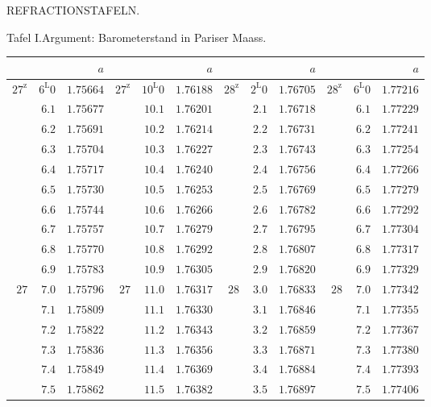 \begin{center}
{\small REFRACTIONSTAFELN.\par}
\medskip
Tafel I.\quad Argument: Barometerstand in Pariser Maass.
\medskip
{\fontsize{9}{10.2}\selectfont\setlength{\tabcolsep}{3pt}
\begin{tabular}{rr|r||rr|r||rr|r||rr|r}
&&$a$&&&$a$&&&$a$&&&$a$\\\hline
$27^{\mathrm{z}}$ & $6^{\mathrm{L}}0$ & $1.75664$ & $27^{\mathrm{z}}$ & $10^{\mathrm{L}}0$ & $1.76188$ & $28^{\mathrm{z}}$ & $2^{\mathrm{L}}0$ & $1.76705$ & $28^{\mathrm{z}}$ & $6^{\mathrm{L}}0$ & $1.77216$\\
 & $6.1$ & $1.75677$ &  & $10.1$ & $1.76201$ &  & $2.1$ & $1.76718$ &  & $6.1$ & $1.77229$\\
 & $6.2$ & $1.75691$ &  & $10.2$ & $1.76214$ &  & $2.2$ & $1.76731$ &  & $6.2$ & $1.77241$\\
 & $6.3$ & $1.75704$ &  & $10.3$ & $1.76227$ &  & $2.3$ & $1.76743$ &  & $6.3$ & $1.77254$\\
 & $6.4$ & $1.75717$ &  & $10.4$ & $1.76240$ &  & $2.4$ & $1.76756$ &  & $6.4$ & $1.77266$\\
 & $6.5$ & $1.75730$ &  & $10.5$ & $1.76253$ &  & $2.5$ & $1.76769$ &  & $6.5$ & $1.77279$\\
 & $6.6$ & $1.75744$ &  & $10.6$ & $1.76266$ &  & $2.6$ & $1.76782$ &  & $6.6$ & $1.77292$\\
 & $6.7$ & $1.75757$ &  & $10.7$ & $1.76279$ &  & $2.7$ & $1.76795$ &  & $6.7$ & $1.77304$\\
 & $6.8$ & $1.75770$ &  & $10.8$ & $1.76292$ &  & $2.8$ & $1.76807$ &  & $6.8$ & $1.77317$\\
 & $6.9$ & $1.75783$ &  & $10.9$ & $1.76305$ &  & $2.9$ & $1.76820$ &  & $6.9$ & $1.77329$\\[4pt]
$27$ & $7.0$ & $1.75796$ & $27$ & $11.0$ & $1.76317$ & $28$ & $3.0$ & $1.76833$ & $28$ & $7.0$ & $1.77342$\\
 & $7.1$ & $1.75809$ &  & $11.1$ & $1.76330$ &  & $3.1$ & $1.76846$ &  & $7.1$ & $1.77355$\\
 & $7.2$ & $1.75822$ &  & $11.2$ & $1.76343$ &  & $3.2$ & $1.76859$ &  & $7.2$ & $1.77367$\\
 & $7.3$ & $1.75836$ &  & $11.3$ & $1.76356$ &  & $3.3$ & $1.76871$ &  & $7.3$ & $1.77380$\\
 & $7.4$ & $1.75849$ &  & $11.4$ & $1.76369$ &  & $3.4$ & $1.76884$ &  & $7.4$ & $1.77393$\\
 & $7.5$ & $1.75862$ &  & $11.5$ & $1.76382$ &  & $3.5$ & $1.76897$ &  & $7.5$ & $1.77406$\\

\end{tabular}}
\end{center}
